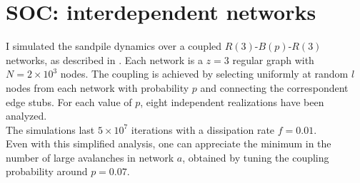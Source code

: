 \section{SOC: interdependent networks}
\label{ch:SM_SOC2}
I simulated the sandpile dynamics over a coupled $R(3)$-$B(p)$-$R(3)$ networks, as described in \cite{brummitt2012suppressing}. Each network is a $z=3$ regular graph with $N=2\times 10^3$ nodes. The coupling is achieved by selecting uniformly at random $l$ nodes from each network with probability $p$ and connecting the correspondent edge stubs. For each value of $p$, eight independent realizations have been analyzed. \\
The simulations last $5 \times 10^7$ iterations with a dissipation rate $f=0.01$. \\
Even with this simplified analysis, one can appreciate the minimum in the number of large avalanches in network $a$, obtained by tuning the coupling probability around $p=0.07$. 

